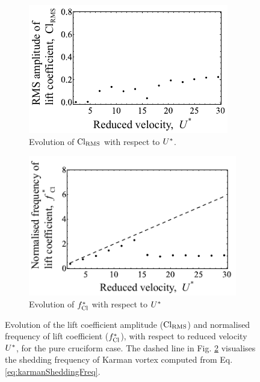 \documentclass[oneside]{utmthesis}
\begin{document}
\begin{figure}
  \centering
  \begin{subfigure}[h]{0.38\textwidth}
    \includegraphics[width=\textwidth]{figs/clRMS5}
    \caption{Evolution of $\text{Cl}_{\text{RMS}}$ with respect to $U^{*}$.}
    \label{fig:clRMS5}
  \end{subfigure}
  \hspace{6mm}
  \begin{subfigure}[h]{0.38\textwidth}
    \includegraphics[width=\textwidth]{figs/clFreq5}
    \caption{Evolution of $f_{\text{Cl}}^{*}$ with respect to $U^{*}$}
    \label{fig:clFreq5}
  \end{subfigure}

  \caption{Evolution of the lift coefficient \rms{} amplitude ($\text{Cl}_{\text{RMS}}$) and normalised frequency of lift coefficient ($f_{\text{Cl}}^{*}$), with respect to reduced velocity $U^{*}$, for the pure cruciform case. The dashed line in Fig. \ref{fig:clFreq5} visualises the shedding frequency of Karman vortex computed from Eq. \ref{eq:karmanSheddingFreq}.} \label{fig:cl90}
\end{figure}
\end{document}
